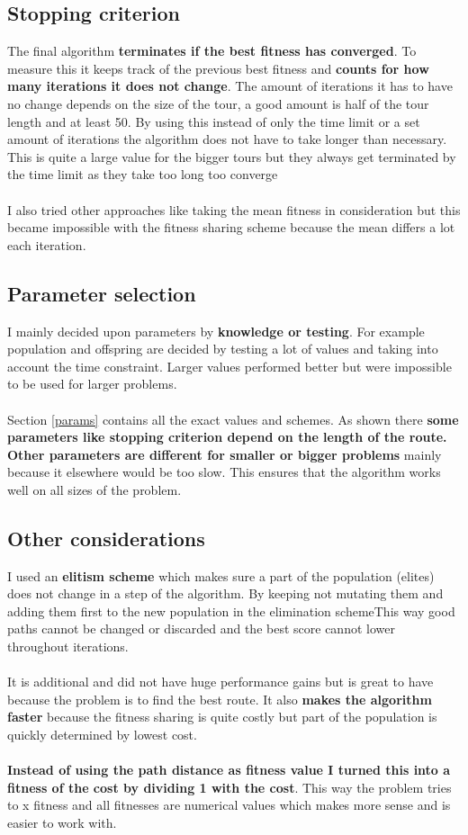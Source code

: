 \documentclass[a4paper,10pt]{article}
\begin{document}
\subsection{Stopping criterion}
The final algorithm \textbf{terminates if the best fitness has converged}. To measure this it keeps track of the previous best fitness and \textbf{counts for how many iterations it does not change}. The amount of iterations it has to have no change depends on the size of the tour, a good amount is half of the tour length and at least 50. By using this instead of only the time limit or a set amount of iterations the algorithm does not have to take longer than necessary. This is quite a large value for the bigger tours but they always get terminated by the time limit as they take too long too converge
\\\\
I also tried other approaches like taking the mean fitness in consideration but this became impossible with the fitness sharing scheme because the mean differs a lot each iteration. 

\subsection{Parameter selection}
\label{ps}
I mainly decided upon parameters by \textbf{knowledge or testing}. For example population and offspring are decided by testing a lot of values and taking into account the time constraint. Larger values performed better but were impossible to be used for larger problems.
\\\\
Section \ref{params} contains all the exact values and schemes. As shown there \textbf{some parameters like stopping criterion depend on the length of the route. Other parameters are different for smaller or bigger problems} mainly because it elsewhere would be too slow. This ensures that the algorithm works well on all sizes of the problem.

\subsection{Other considerations}
I used an \textbf{elitism scheme} which makes sure a part of the population (elites) does not change in a step of the algorithm. By keeping not mutating them and adding them first to the new population in the elimination schemeThis way good paths cannot be changed or discarded and the best score cannot lower throughout iterations. 
\\\\
It is additional and did not have huge performance gains but is great to have because the problem is to find the best route. It also \textbf{makes the algorithm faster} because the fitness sharing is quite costly but part of the population is quickly determined by lowest cost.
\\\\
\textbf{Instead of using the path distance as fitness value I turned this into a fitness of the cost by dividing 1 with the cost}. This way the problem tries to x fitness and all fitnesses are numerical values which makes more sense and is easier to work with.
\end{document}
